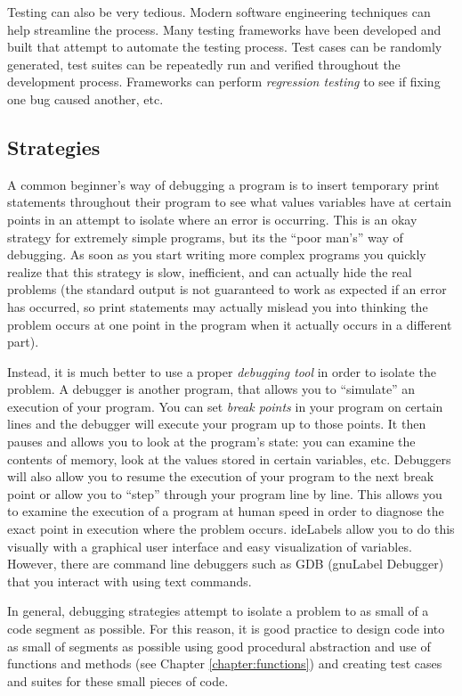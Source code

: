 Testing can also be very tedious.  Modern software engineering techniques
can help streamline the process.  Many testing frameworks have been
developed and built that attempt to automate the testing process.  Test 
cases can be randomly generated, test suites can be repeatedly 
run and verified throughout the development process.  Frameworks
can perform \emph{regression testing} to see if fixing one bug 
caused another, etc.

\subsection{Strategies}

A common beginner's way of debugging a program is to insert 
temporary print statements throughout their program to see what
values variables have at certain points in an attempt to isolate where
an error is occurring.  This is an okay strategy for extremely simple
programs, but its the ``poor man's'' way of debugging.  As soon as
you start writing more complex programs you quickly realize that this
strategy is slow, inefficient, and can actually hide the real problems 
(the standard output is not guaranteed to work as expected if an error
has occurred, so print statements may actually mislead you into thinking
the problem occurs at one point in the program when it actually
occurs in a different part).

Instead, it is much better to use a proper \emph{debugging tool} in 
order to isolate the problem.  A debugger is another program, that
allows you to ``simulate'' an execution of your program.  You can set
\emph{break points} in your program on certain lines and the debugger
will execute your program up to those points.  It then pauses and 
allows you to look at the program's state: you can examine the
contents of memory, look at the values stored in certain variables, etc.
Debuggers will also allow you to resume the execution of your program
to the next break point or allow you to ``step'' through your program
line by line.  This allows you to examine the execution of a program
at human speed in order to diagnose the exact point in execution where
the problem occurs.  \glspl{ideLabel} allow you to do this visually with
a graphical user interface and easy visualization of variables.  However,
there are command line debuggers such as GDB (\gls{gnuLabel} Debugger)
that you interact with using text commands.

In general, debugging strategies attempt to isolate a problem 
to as small of a code segment as possible.  For this reason, it
is good practice to design code into as small of segments as possible
using good procedural abstraction and use of functions and methods
(see Chapter \ref{chapter:functions}) and creating test cases and suites
for these small pieces of code.  

